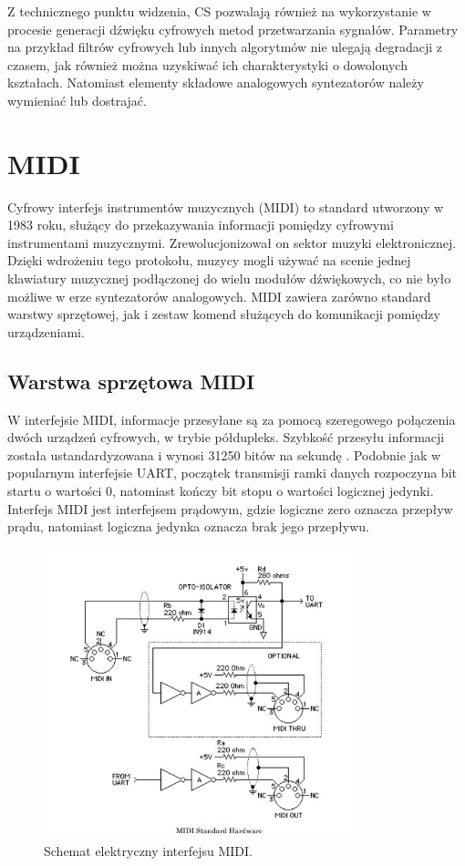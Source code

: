 
Z technicznego punktu widzenia, CS pozwalają również na wykorzystanie w procesie generacji dźwięku cyfrowych metod przetwarzania sygnałów. Parametry na przykład filtrów cyfrowych lub innych algorytmów nie ulegają degradacji z czasem, jak również można uzyskiwać ich charakterystyki o dowolonych kształach. Natomiast elementy składowe analogowych syntezatorów należy wymieniać lub dostrajać.


\section{MIDI}
Cyfrowy interfejs instrumentów muzycznych (MIDI) to standard utworzony w 1983 roku, służący do przekazywania informacji pomiędzy cyfrowymi instrumentami muzycznymi. Zrewolucjonizował on sektor muzyki elektronicznej. Dzięki wdrożeniu tego protokołu, muzycy mogli używać na scenie jednej klawiatury muzycznej podłączonej do wielu modułów dźwiękowych, co nie było możliwe w erze syntezatorów analogowych. MIDI zawiera zarówno standard warstwy sprzętowej, jak i zestaw komend służących do komunikacji pomiędzy urządzeniami.

\subsection{Warstwa sprzętowa MIDI}
W interfejsie MIDI, informacje przesyłane są za pomocą szeregowego połączenia dwóch urządzeń cyfrowych, w trybie półdupleks. Szybkość przesyłu informacji została ustandardyzowana i wynosi 31250 bitów na sekundę \cite{dokumentacja_midi}. 
Podobnie jak w popularnym interfejsie UART, początek transmisji ramki danych rozpoczyna bit startu o wartości 0, natomiast kończy bit stopu o wartości logicznej jedynki. Interfejs MIDI jest interfejsem prądowym, gdzie logiczne zero oznacza przepływ prądu, natomiast logiczna jedynka oznacza brak jego przepływu.

\begin{figure}[H]
	\centering
	\includegraphics[width=9cm]{./grafiki/hardware_midi}
	\captionsetup{justification=centering}
	\caption{Schemat elektryczny interfejsu MIDI.}
	\label{rys:hardware_midi}
\end{figure}

